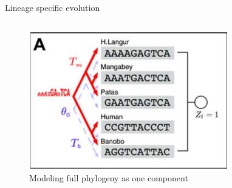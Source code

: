 

\begin{frame}[fragile]{Lineage specific evolution}
   \begin{columns}[T,onlytextwidth]
    \begin{figure}
		\includegraphics[width=0.77\textwidth]{images/monkey-model.png}
        \caption{Modeling full phylogeny as one component}
	\end{figure}
    \end{columns}
\end{frame}

